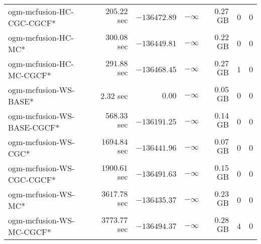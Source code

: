 \begin{table}[H]
\begin{tabular}{lrrrrrr}
ogm-mcfusion-HC-CGC-CGCF* & $       205.22$ sec & $   -136472.89$ & $-\infty$ & $         0.27$ GB & $       0$ & $       0$ \\ 
 ogm-mcfusion-HC-MC* & $       300.08$ sec & $   -136449.81$ & $-\infty$ & $         0.22$ GB & $       0$ & $       0$ \\ 
ogm-mcfusion-HC-MC-CGCF* & $       291.88$ sec & $   -136468.45$ & $-\infty$ & $         0.27$ GB & $       1$ & $       0$ \\ 
ogm-mcfusion-WS-BASE* & $         2.32$ sec & $         0.00$ & $-\infty$ & $         0.05$ GB & $       0$ & $       0$ \\ 
ogm-mcfusion-WS-BASE-CGCF* & $       568.33$ sec & $   -136191.25$ & $-\infty$ & $         0.14$ GB & $       0$ & $       0$ \\ 
ogm-mcfusion-WS-CGC* & $      1694.84$ sec & $   -136441.96$ & $-\infty$ & $         0.07$ GB & $       0$ & $       0$ \\ 
ogm-mcfusion-WS-CGC-CGCF* & $      1900.61$ sec & $   -136491.63$ & $-\infty$ & $         0.15$ GB & $       0$ & $       0$ \\ 
 ogm-mcfusion-WS-MC* & $      3617.78$ sec & $   -136435.37$ & $-\infty$ & $         0.23$ GB & $       0$ & $       0$ \\ 
ogm-mcfusion-WS-MC-CGCF* & $      3773.77$ sec & $   -136494.37$ & $-\infty$ & $         0.28$ GB & $       4$ & $       0$ \\ 
\bottomrule
\end{tabular}
\end{table}